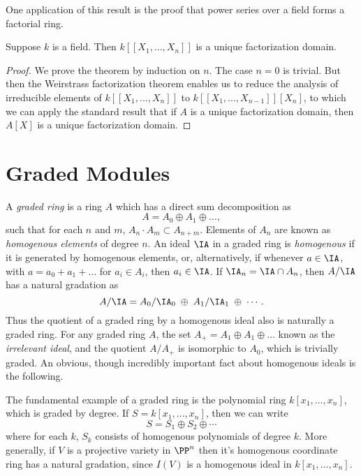One application of this result is the proof that power series over a field forms a factorial ring.

\begin{theorem}
    Suppose $k$ is a field. Then $k[[X_1,\dots,X_n]]$ is a unique factorization domain.
\end{theorem}
\begin{proof}
    We prove the theorem by induction on $n$. The case $n = 0$ is trivial. But then the Weirstrass factorization theorem enables us to reduce the analysis of irreducible elements of $k[[X_1,\dots,X_n]]$ to $k[[X_1,\dots,X_{n-1}]][X_n]$, to which we can apply the standard result that if $A$ is a unique factorization domain, then $A[X]$ is a unique factorization domain.
\end{proof}






\chapter{Graded Modules}

A \emph{graded ring} is a ring $A$ which has a direct sum decomposition as
%
\[ A = A_0 \oplus A_1 \oplus \dots, \]
%
such that for each $n$ and $m$, $A_n \cdot A_m \subset A_{n + m}$. Elements of $A_n$ are known as \emph{homogenous elements} of degree $n$. An ideal $\IA$ in a graded ring is \emph{homogenous} if it is generated by homogenous elements, or, alternatively, if whenever $a \in \IA$, with $a = a_0 + a_1 + \dots$ for $a_i \in A_i$, then $a_i \in \IA$. If $\IA_n = \IA \cap A_n$, then $A/\IA$ has a natural gradation as
%
\[ A/\IA = A_0/\IA_0\; \oplus\; A_1/\IA_1\; \oplus\; \cdots. \]
%
Thus the quotient of a graded ring by a homogenous ideal also is naturally a graded ring. For any graded ring $A$, the set $A_+ = A_1 \oplus A_1 \oplus \dots$ known as the \emph{irrelevant ideal}, and the quotient $A/A_+$ is isomorphic to $A_0$, which is trivially graded. An obvious, though incredibly important fact about homogenous ideals is the following.

\begin{example}
    The fundamental example of a graded ring is the polynomial ring $k[x_1, \dots, x_n]$, which is graded by degree. If $S = k[x_1,\dots,x_n]$, then we can write
    \[ S = S_1 \oplus S_2 \oplus \cdots \]
    where for each $k$, $S_k$ consists of homogenous polynomials of degree $k$. More generally, if $V$ is a projective variety in $\PP^n$ then it's homogenous coordinate ring has a natural gradation, since $I(V)$ is a homogenous ideal in $k[x_1,\dots,x_n]$.
\end{example}

